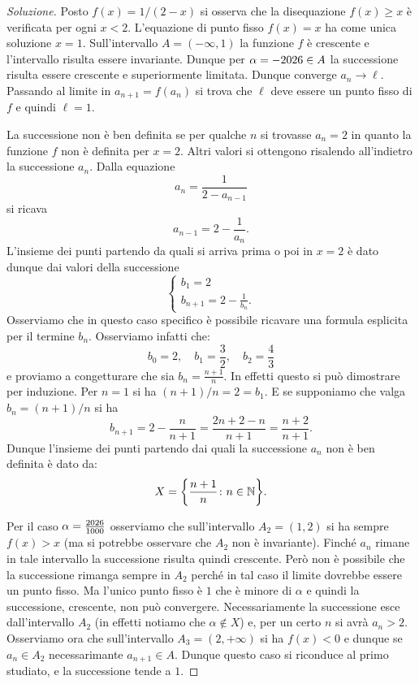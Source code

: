 \begin{proof}[Soluzione]
Posto $f(x) = 1/(2-x)$
si osserva che la disequazione $f(x)\ge x$ è verificata per ogni
$x<2$. L'equazione di punto fisso $f(x)=x$ ha come unica soluzione
$x=1$. Sull'intervallo $A=(-\infty,1)$ la funzione $f$ è crescente e
l'intervallo risulta essere invariante. Dunque per
$\alpha=-\the\year \in A$ la successione risulta essere crescente e superiormente
limitata. Dunque converge $a_n\to \ell$. Passando al limite in
$a_{n+1} = f(a_n)$ si trova che $\ell$ deve essere un punto fisso di
$f$ e quindi $\ell = 1$.

La successione non è ben definita se per qualche $n$ si trovasse
$a_n=2$ in quanto la funzione $f$ non è definita per $x=2$. Altri
valori si ottengono risalendo all'indietro la successione $a_n$.
Dalla equazione
\[
a_n = \frac{1}{2-a_{n-1}}
\]
si ricava
\[
a_{n-1} = 2-\frac{1}{a_n}.
\]
L'insieme dei punti partendo da quali si arriva prima o poi in $x=2$ è
dato dunque dai valori della successione
\[
\begin{cases}
  b_1 = 2\\
  b_{n+1} = 2 - \frac{1}{b_n}.
\end{cases}
\]
Osserviamo che in questo caso specifico è possibile ricavare una
formula esplicita per il termine $b_n$. Osserviamo infatti che:
\[
b_0 = 2,\quad
b_1 = \frac{3}{2},\quad
b_2 = \frac{4}{3}
\]
e proviamo a congetturare che sia $b_n = \frac{n+1} n$. In effetti questo
si può dimostrare per induzione. Per $n=1$ si ha $(n+1)/n = 2 =
b_1$. E se supponiamo che valga $b_n = (n+1)/n$ si ha
\[
b_{n+1} = 2 - \frac{n}{n+1} = \frac{2n+2-n}{n+1} = \frac{n+2}{n+1}.
\]
Dunque l'insieme dei punti partendo dai quali la successione $a_n$ non
è ben definita è dato da:
\[
  X= {\left\{ \frac{n+1}{n}\colon n \in {\mathbb N} \right\}}.
\]

Per il caso $\alpha=\frac{\the\year}{1000}$ osserviamo che sull'intervallo
$A_2 = (1,2)$ si ha sempre $f(x)>x$ (ma si potrebbe osservare che
$A_2$ non è invariante). Finché $a_n$ rimane in
tale intervallo la successione risulta quindi crescente. Però non è
possibile che la successione rimanga sempre in $A_2$ perché in tal
caso il limite dovrebbe essere un punto
fisso. Ma l'unico punto fisso è $1$ che è minore di $\alpha$ e quindi
la successione, crescente, non può convergere. Necessariamente la
successione esce dall'intervallo $A_2$ (in effetti notiamo che $\alpha
\not \in X$) e, per un certo $n$ si avrà $a_n>2$. Osserviamo ora che
sull'intervallo $A_3 = (2,+\infty)$ si ha $f(x)<0$ e dunque
se $a_n\in A_2$ necessarimante $a_{n+1} \in A$. Dunque questo caso si
riconduce al primo studiato, e la successione tende a $1$.
\end{proof}

